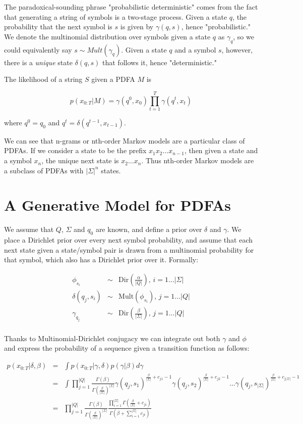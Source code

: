 \documentclass[11pt]{article}
\begin{document}
The paradoxical-sounding phrase "probabilistic deterministic" comes from the fact that generating a string of symbols is a two-stage process.  Given a state $q$, the probability that the next symbol is $s$ is given by $\gamma(q,s)$, hence "probabilistic."  We denote the multinomial distribution over symbols given a state $q$ as $\gamma_q$, so we could equivalently say $s \sim Mult(\gamma_q)$.  Given a state $q$ and a symbol $s$, however, there is a {\it unique} state $\delta(q,s)$ that follows it, hence "deterministic."  

The likelihood of a string $S$ given a PDFA $M$ is

\[ p(x_{0:T}|M) = \gamma(q^0,x_0)\prod_{t=1}^T \gamma(q^t,x_t) \]

where $q^0 = q_0$ and $q^t = \delta(q^{t-1},x_{t-1})$.

We can see that n-grams or nth-order Markov models are a particular class of PDFAs.  If we consider a state to be the prefix $x_1 x_2 \ldots x_{n-1}$, then given a state and a symbol $x_n$, the unique next state is $x_2 \ldots x_n$.  Thus nth-order Markov models are a subclass of PDFAs with $|\Sigma|^n$ states.

\section{A Generative Model for PDFAs}

We assume that $Q$, $\Sigma$ and $q_0$ are known, and define a prior over $\delta$ and $\gamma$.  We place a Dirichlet prior over every next symbol probability, and assume that each next state given a state/symbol pair is drawn from a multinomial probability for that symbol, which also has a Dirichlet prior over it.  Formally:

\begin{eqnarray*}
\phi_{s_i}  & \sim & \mathrm{Dir}\left(\frac{\alpha}{|Q|}\right), \, i = 1\ldots |\Sigma| \\
\delta(q_j,s_i) & \sim & \mathrm{Mult}\left(\phi_{s_i}\right), \, j = 1\ldots |Q| \\
\gamma_{q_j} & \sim & \mathrm{Dir}\left(\frac{\beta}{|\Sigma|}\right), \, j = 1\ldots |Q| \\
\end{eqnarray*}

Thanks to Multinomial-Dirichlet conjugacy we can integrate out both $\gamma$ and $\phi$ and express the probability of a sequence given a transition function as follows:

\begin{eqnarray*}
 p(x_{0:T}|\delta,\beta) & = & \int p(x_{0:T}|\gamma,\delta) p(\gamma|\beta) d\gamma \\
 & = &  \int \prod_{j=1}^{|Q|} \frac{\Gamma(\beta)}{\Gamma(\frac{\beta}{|\Sigma|})^{|\Sigma|}} \gamma(q_j,s_1)^{\frac{\beta}{|\Sigma|}+c_{j1}-1} \gamma(q_j,s_2)^{\frac{\beta}{|\Sigma|}+c_{j2}-1} \ldots \gamma(q_j,s_{|\Sigma|})^{\frac{\beta}{|\Sigma|}+c_{j|\Sigma|}-1} \\
 & = & \prod_{j=1}^{|Q|} \frac{\Gamma(\beta)}{\Gamma(\frac{\beta}{|\Sigma|})^{|\Sigma|}} \frac{\prod_{i=1}^{|\Sigma|}\Gamma(\frac{\beta}{|\Sigma|} + c_{ji})}{\Gamma(\beta + \sum_{i=1}^{|\Sigma|} c_{ji})}
 \end{eqnarray*}
 
\end{document}
